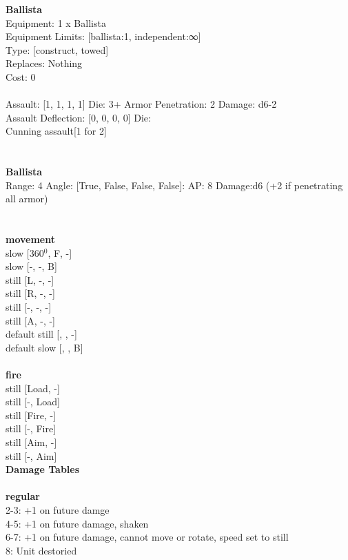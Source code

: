 \noindent 

{\bf Ballista } \\
Equipment: 1 x Ballista \\
Equipment Limits: [ballista:1, independent:∞] \\
Type: [construct, towed] \\
Replaces: Nothing \\
Cost: 0\\
\ \\
Assault: [1, 1, 1, 1] Die: 3+ Armor Penetration: 2 Damage: d6-2 \\
Assault Deflection: [0, 0, 0, 0] Die: \\
\indent Cunning assault[1 for 2]\\ 
 
\ \\

\ \\
{\bf Ballista } \\



Range: 4  Angle: [True, False, False, False]: AP: 8 Damage:d6 (+2 if penetrating all armor) \\




 
\ \\



\ \\ {\bf movement } \\
slow [360$^0$, F, -] \\
slow [-, -, B] \\
still [L, -, -] \\
still [R, -, -] \\
still [-, -, -] \\
still [A, -, -] \\
default still [, , -] \\
default slow [, , B] \\
\ \\ {\bf fire } \\
still [Load, -] \\
still [-, Load] \\
still [Fire, -] \\
still [-, Fire] \\
still [Aim, -] \\
still [-, Aim] \\


{\bf Damage Tables} \\
\ \\ {\bf regular } \\
2-3: +1 on future damge \\
4-5: +1 on future damage, shaken \\
6-7: +1 on future damage, cannot move or rotate, speed set to still \\
8: Unit destoried \\










